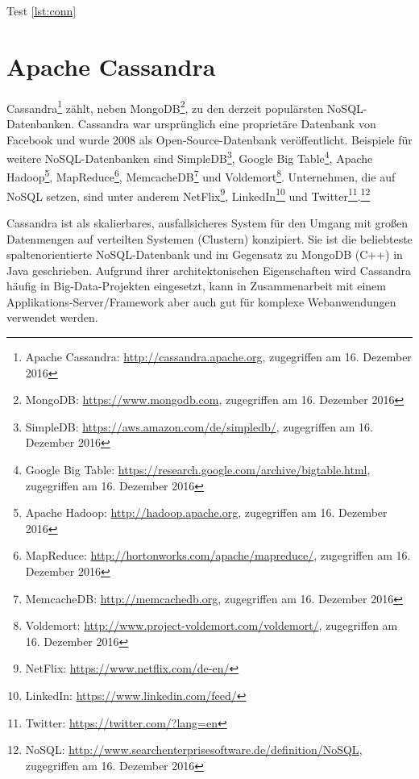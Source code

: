 Test \ref{lst:conn}
\section{Apache Cassandra}
Cassandra\footnote{Apache Cassandra: \url{http://cassandra.apache.org}, zugegriffen am 16. Dezember 2016} zählt, neben MongoDB\footnote{MongoDB: \url{https://www.mongodb.com}, zugegriffen am 16. Dezember 2016}, zu den derzeit populärsten NoSQL-Datenbanken. Cassandra war ursprünglich eine proprietäre Datenbank von Facebook und wurde 2008 als Open-Source-Datenbank veröffentlicht. Beispiele für weitere NoSQL-Datenbanken sind SimpleDB\footnote{SimpleDB: \url{https://aws.amazon.com/de/simpledb/}, zugegriffen am 16. Dezember 2016}, Google Big Table\footnote{Google Big Table: \url{https://research.google.com/archive/bigtable.html}, zugegriffen am 16. Dezember 2016}, Apache Hadoop\footnote{Apache Hadoop: \url{http://hadoop.apache.org}, zugegriffen am 16. Dezember 2016}, MapReduce\footnote{MapReduce: \url{http://hortonworks.com/apache/mapreduce/}, zugegriffen am 16. Dezember 2016}, MemcacheDB\footnote{MemcacheDB: \url{http://memcachedb.org}, zugegriffen am 16. Dezember 2016} und Voldemort\footnote{Voldemort: \url{http://www.project-voldemort.com/voldemort/}, zugegriffen am 16. Dezember 2016}. Unternehmen, die auf NoSQL setzen, sind unter anderem NetFlix\footnote{NetFlix: \url{https://www.netflix.com/de-en/}}, LinkedIn\footnote{LinkedIn: \url{https://www.linkedin.com/feed/}} und Twitter\footnote{Twitter: \url{https://twitter.com/?lang=en}}.\footnote{NoSQL: \url{http://www.searchenterprisesoftware.de/definition/NoSQL}, zugegriffen am 16. Dezember 2016}\newline

Cassandra ist als skalierbares, ausfallsicheres System für den Umgang mit großen Datenmengen auf verteilten Systemen (Clustern) konzipiert. Sie ist die beliebteste spaltenorientierte NoSQL-Datenbank und im Gegensatz zu MongoDB (C++) in Java geschrieben. Aufgrund ihrer architektonischen Eigenschaften wird Cassandra häufig in Big-Data-Projekten eingesetzt, kann in Zusammenarbeit mit einem Applikations-Server/Framework aber auch gut für komplexe Webanwendungen verwendet werden.
